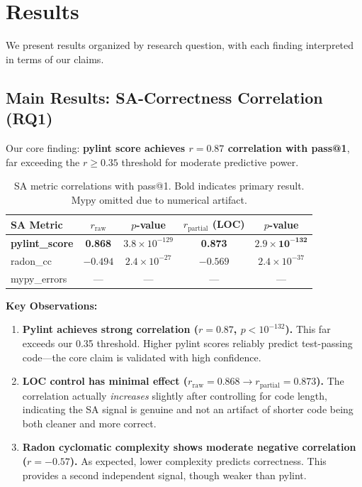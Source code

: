 \section{Results}
\label{sec:results}

We present results organized by research question, with each finding interpreted in terms of our claims.

\subsection{Main Results: SA-Correctness Correlation (RQ1)}

Our core finding: \textbf{pylint score achieves $r=0.87$ correlation with pass@1}, far exceeding the $r\geq0.35$ threshold for moderate predictive power.

\begin{table}[t]
\centering
\caption{SA metric correlations with pass@1. Bold indicates primary result. Mypy omitted due to numerical artifact.}
\label{tab:main-results}
\begin{tabular}{@{}lcccc@{}}
\toprule
SA Metric & $r_{\text{raw}}$ & $p$-value & $r_{\text{partial}}$ (LOC) & $p$-value \\
\midrule
\textbf{pylint\_score} & \textbf{0.868} & $3.8 \times 10^{-129}$ & \textbf{0.873} & $\mathbf{2.9 \times 10^{-132}}$ \\
radon\_cc & $-0.494$ & $2.4 \times 10^{-27}$ & $-0.569$ & $2.4 \times 10^{-37}$ \\
mypy\_errors & --- & --- & --- & --- \\
\bottomrule
\end{tabular}
\end{table}

\textbf{Key Observations:}

\begin{enumerate}
\item \textbf{Pylint achieves strong correlation ($r=0.87$, $p<10^{-132}$).} This far exceeds our 0.35 threshold. Higher pylint scores reliably predict test-passing code---the core claim is validated with high confidence.

\item \textbf{LOC control has minimal effect ($r_{\text{raw}}=0.868 \rightarrow r_{\text{partial}}=0.873$).} The correlation actually \emph{increases} slightly after controlling for code length, indicating the SA signal is genuine and not an artifact of shorter code being both cleaner and more correct.

\item \textbf{Radon cyclomatic complexity shows moderate negative correlation ($r=-0.57$).} As expected, lower complexity predicts correctness. This provides a second independent signal, though weaker than pylint.
\end{enumerate}

